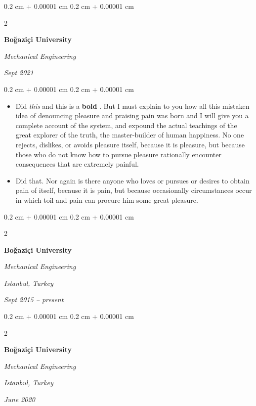 \documentclass[10pt, letterpaper]{article}
\newenvironment{highlights}{
    \begin{itemize}[
        topsep=0.10 cm,
        parsep=0.10 cm,
        partopsep=0pt,
        itemsep=0pt,
        leftmargin=0.4 cm + 10pt
    ]
}{
    \end{itemize}
} %
\newenvironment{onecolentry}{
    \begin{adjustwidth}{
        0.2 cm + 0.00001 cm
    }{
        0.2 cm + 0.00001 cm
    }
}{
    \end{adjustwidth}
} %
\newenvironment{twocolentry}[2][]{
    \onecolentry
    \def\secondColumn{#2}
    \setcolumnwidth{\fill, 4.5 cm}
    \begin{paracol}{2}
}{
    \switchcolumn \raggedleft \secondColumn
    \end{paracol}
    \endonecolentry
} %
\let\hrefWithoutArrow\href
\renewcommand{\href}[2]{\hrefWithoutArrow{#1}{\ifthenelse{\equal{#2}{}}{ }{#2 }\raisebox{.15ex}{\footnotesize \faExternalLink*}}}
\begin{document}
        \vspace{0.2 cm}

        \begin{twocolentry}{
            
            
        \textit{Sept 2021}}
            \textbf{Boğaziçi University}

            \textit{Mechanical Engineering}
        \end{twocolentry}

        \vspace{0.10 cm}
        \begin{onecolentry}
            \begin{highlights}
                \item Did \textit{this} and this is a \textbf{bold} \href{https://example.com}{link}. But I must explain to you how all this mistaken idea of denouncing pleasure and praising pain was born and I will give you a complete account of the system, and expound the actual teachings of the great explorer of the truth, the master-builder of human happiness. No one rejects, dislikes, or avoids pleasure itself, because it is pleasure, but because those who do not know how to pursue pleasure rationally encounter consequences that are extremely painful.
                \item Did that. Nor again is there anyone who loves or pursues or desires to obtain pain of itself, because it is pain, but because occasionally circumstances occur in which toil and pain can procure him some great pleasure.
            \end{highlights}
        \end{onecolentry}


        \vspace{0.2 cm}

        \begin{twocolentry}{
        \textit{Istanbul, Turkey}    
            
        \textit{Sept 2015 – present}}
            \textbf{Boğaziçi University}

            \textit{Mechanical Engineering}
        \end{twocolentry}



        \vspace{0.2 cm}

        \begin{twocolentry}{
        \textit{Istanbul, Turkey}    
            
        \textit{June 2020}}
            \textbf{Boğaziçi University}

            \textit{Mechanical Engineering}
        \end{twocolentry}
\end{document}

